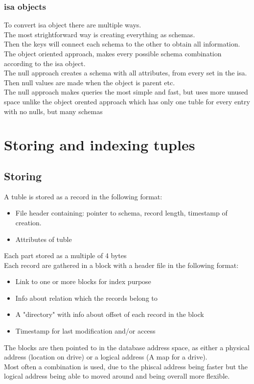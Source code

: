\documentclass[12pt, a4paper]{article}
\begin{document}
			\subsubsection{isa objects}
				To convert isa object there are multiple ways.\\
				The most strightforward way is creating everything as schemas.\\
				Then the keys will connect each schema to the other to obtain all information.\\
				The object oriented approach, makes every possible schema combination according to the isa object.\\
				The null approach creates a schema with all attributes, from every set in the isa. Then null values are made when the object is parent etc.\\
				The null approach makes queries the most simple and fast, but uses more unused space unlike the object orented approach which has only one tuble for every entry with no nulls, but many schemas
	\section{Storing and indexing tuples}
		\subsection{Storing}
			A tuble is stored as a record in the following format:
			\begin{itemize}
				\item File header containing: pointer to schema, record length, timestamp of creation.
				\item Attributes of tuble
			\end{itemize}
			Each part stored as a multiple of 4  bytes \\
			Each record are gathered in a block with a header file in the following format:
			\begin{itemize}
				\item Link to one or more blocks for index purpose
				\item Info about relation which the records belong to
				\item A "directory" with info about offset of each record in the block
				\item Timestamp for last modification and/or access
			\end{itemize}
			The blocks are then pointed to in the database address space, as either a physical address (location on drive) or a logical address (A map for a drive).\\
			Most often a combination is used, due to the phiscal address being faster but the logical address being able to moved around and being overall more flexible.\\
\end{document}
